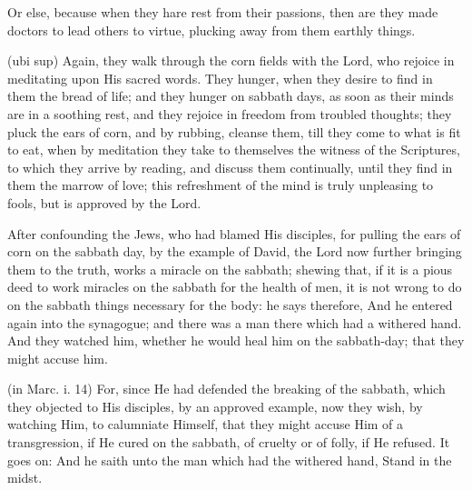  Or else, because when they hare rest from their passions, then are they made doctors to lead others to virtue, plucking away from them earthly things.

 (ubi sup) Again, they walk through the corn fields with the Lord, who rejoice in meditating upon His sacred words. They hunger, when they desire to find in them the bread of life; and they hunger on sabbath days, as soon as their minds are in a soothing rest, and they rejoice in freedom from troubled thoughts; they pluck the ears of corn, and by rubbing, cleanse them, till they come to what is fit to eat, when by meditation they take to themselves the witness of the Scriptures, to which they arrive by reading, and discuss them continually, until they find in them the marrow of love; this refreshment of the mind is truly unpleasing to fools, but is approved by the Lord.


 

 After confounding the Jews, who had blamed His disciples, for pulling the ears of corn on the sabbath day, by the example of David, the Lord now further bringing them to the truth, works a miracle on the sabbath; shewing that, if it is a pious deed to work miracles on the sabbath for the health of men, it is not wrong to do on the sabbath things necessary for the body: he says therefore, And he entered again into the synagogue; and there was a man there which had a withered hand. And they watched him, whether he would heal him on the sabbath-day; that they might accuse him.

 (in Marc. i. 14) For, since He had defended the breaking of the sabbath, which they objected to His disciples, by an approved example, now they wish, by watching Him, to calumniate Himself, that they might accuse Him of a transgression, if He cured on the sabbath, of cruelty or of folly, if He refused. It goes on: And he saith unto the man which had the withered hand, Stand in the midst.


